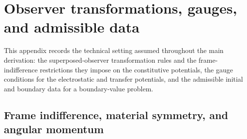 \section{Observer transformations, gauges, and admissible data}
\label{sec:technical_setting}

This appendix records the technical setting assumed throughout the main
derivation: the superposed-observer transformation rules and the
frame-indifference restrictions they impose on the constitutive potentials, the
gauge conditions for the electrostatic and transfer potentials, and the
admissible initial and boundary data for a boundary-value problem.

\subsection{Frame indifference, material symmetry, and angular momentum}

